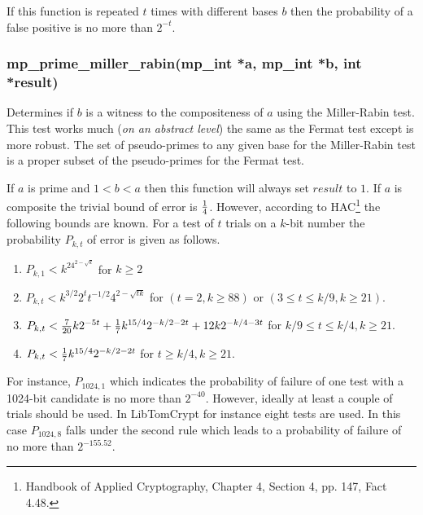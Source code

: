 \documentclass{article}
\begin{document}
If this function is repeated $t$ times with different bases $b$ then the probability of a false positive
is no more than $2^{-t}$.

\subsubsection{mp\_prime\_miller\_rabin(mp\_int *a, mp\_int *b, int *result)}
Determines if $b$ is a witness to the compositeness of $a$ using the Miller-Rabin test.  This test
works much (\textit{on an abstract level}) the same as the Fermat test except is more robust.  The
set of pseudo-primes to any given base for the Miller-Rabin test is a proper subset of the pseudo-primes
for the Fermat test.  

If $a$ is prime and $1 < b < a$ then this function will always set $result$ to $1$.  If $a$ is composite
the trivial bound of error is $1 \over 4$.  However, according to HAC\footnote{Handbook of Applied
Cryptography, Chapter 4, Section 4, pp. 147, Fact 4.48.} the following bounds are 
known.  For a test of $t$ trials on a $k$-bit number the probability $P_{k,t}$ of error is given as
follows.

\begin{enumerate}
\item $P_{k,1} < k^24^{2 - \sqrt{k}}$ for $k \ge 2$
\item $P_{k,t} < k^{3/2}2^tt^{-1/2}4^{2-\sqrt{tk}}$ for $(t = 2, k \ge 88)$ or $(3 \le t \le k/9, k \ge 21)$.
\item $P_{k,t} < {7 \over 20}k2^{-5t} + {1 \over 7}k^{15/4}2^{-k/2-2t} + 12k2^{-k/4-3t}$ for $k/9 \le t \le k/4, k \ge 21$.
\item $P_{k,t} < {1 \over 7}k^{15/4}2^{-k/2 - 2t}$  for $t \ge k/4, k \ge 21$.
\end{enumerate}

For instance, $P_{1024,1}$ which indicates the probability of failure of one test with a 1024-bit candidate 
is no more than $2^{-40}$.  However, ideally at least a couple of trials should be used.  In LibTomCrypt
for instance eight tests are used.  In this case $P_{1024,8}$ falls under the second rule which leads
to a probability of failure of no more than $2^{-155.52}$.
\end{document}
